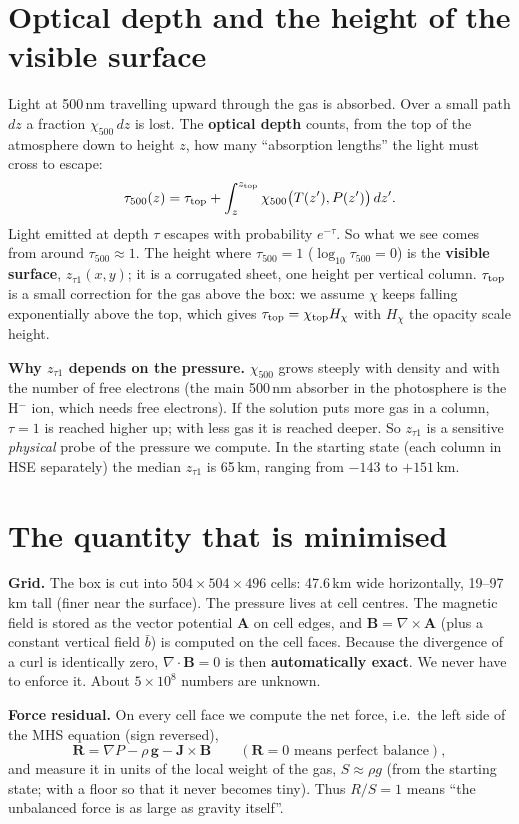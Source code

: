 \documentclass[10pt]{extarticle}
\newcommand{\B}{\mathbf B}\newcommand{\J}{\mathbf J}\newcommand{\Bo}{\mathbf B_{\rm obs}}
\begin{document}
\section{Optical depth and the height of the visible surface}
Light at 500\,nm travelling upward through the gas is absorbed. Over a small path $dz$ a fraction $\chi_{500}\,dz$ is lost. The \textbf{optical depth} counts, from the top of the atmosphere down to height $z$, how many ``absorption lengths'' the light must cross to escape:
\[
\tau_{500}(z)=\tau_{\rm top}+\int_{z}^{z_{\rm top}}\chi_{500}\big(T(z'),P(z')\big)\,dz'.
\]
Light emitted at depth $\tau$ escapes with probability $e^{-\tau}$. So what we see comes from around $\tau_{500}\approx1$. The height where $\tau_{500}=1$ ($\log_{10}\tau_{500}=0$) is the \textbf{visible surface}, $z_{\tau1}(x,y)$; it is a corrugated sheet, one height per vertical column. $\tau_{\rm top}$ is a small correction for the gas above the box: we assume $\chi$ keeps falling exponentially above the top, which gives $\tau_{\rm top}=\chi_{\rm top}H_\chi$ with $H_\chi$ the opacity scale height.

\textbf{Why $z_{\tau1}$ depends on the pressure.} $\chi_{500}$ grows steeply with density and with the number of free electrons (the main 500\,nm absorber in the photosphere is the H$^-$ ion, which needs free electrons). If the solution puts more gas in a column, $\tau=1$ is reached higher up; with less gas it is reached deeper. So $z_{\tau1}$ is a sensitive \emph{physical} probe of the pressure we compute. In the starting state (each column in HSE separately) the median $z_{\tau1}$ is 65\,km, ranging from $-143$ to $+151$\,km.

\section{The quantity that is minimised}
\textbf{Grid.} The box is cut into $504\times504\times496$ cells: 47.6\,km wide horizontally, 19--97\,km tall (finer near the surface). The pressure lives at cell centres. The magnetic field is stored as the vector potential $\mathbf A$ on cell edges, and $\B=\nabla\times\mathbf A$ (plus a constant vertical field $\bar b$) is computed on the cell faces. Because the divergence of a curl is identically zero, $\nabla\cdot\B=0$ is then \textbf{automatically exact}. We never have to enforce it. About $5\times10^8$ numbers are unknown.

\textbf{Force residual.} On every cell face we compute the net force, i.e.\ the left side of the MHS equation (sign reversed),
\[
\mathbf R=\nabla P-\rho\,\mathbf g-\J\times\B \qquad(\mathbf R=0 \text{ means perfect balance}),
\]
and measure it in units of the local weight of the gas, $S\approx\rho g$ (from the starting state; with a floor so that it never becomes tiny). Thus $R/S=1$ means ``the unbalanced force is as large as gravity itself''.
\end{document}
